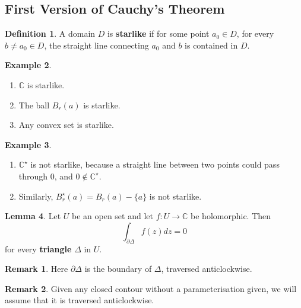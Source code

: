 \documentclass[12pt,a4paper]{article}
\theoremstyle{definition}
\newtheorem{definition}{Definition}[subsection]
\newtheorem{lemma}[definition]{Lemma}
\newtheorem{example}[definition]{Example}
\newtheorem*{remark}{Remark}
\begin{document}
\subsection{First Version of Cauchy's Theorem}

\begin{definition}
	A domain $D$ is \textbf{starlike} if for some point $a_0 \in D$, for every $b \ne a_0 \in D$, the straight line connecting $a_0$ and $b$ is contained in $D$.
\end{definition}

\begin{example}
	\hfill
	\begin{enumerate}
		\item $\mathbb{C}$ is starlike.
		\item The ball $B_r(a)$ is starlike.
		\item Any convex set is starlike.
	\end{enumerate}
\end{example}

\begin{example}
	\hfill
	\begin{enumerate}
		\item $\mathbb{C}^{\star}$ is not starlike, because a straight line between two points could pass through $0$, and $0 \notin \mathbb{C}^{\star}$.
		\item Similarly, $B_r^{\star}(a) = B_r(a) - \{ a \}$ is not starlike.
	\end{enumerate}
\end{example}

\begin{lemma}\label{lem:ctLem1}
	Let $U$ be an open set and let $f: U \rightarrow \mathbb{C}$ be holomorphic. Then
	\[
		\int_{\partial \Delta} f(z) dz = 0
	\]
	for every \textbf{triangle} $\Delta$ in $U$.
\end{lemma}

\begin{remark}
	Here $\partial \Delta$ is the boundary of $\Delta$, traversed anticlockwise.
\end{remark}

\begin{remark}
	Given any closed contour without a parameterisation given, we will assume that it is traversed anticlockwise.
\end{remark}
\end{document}
